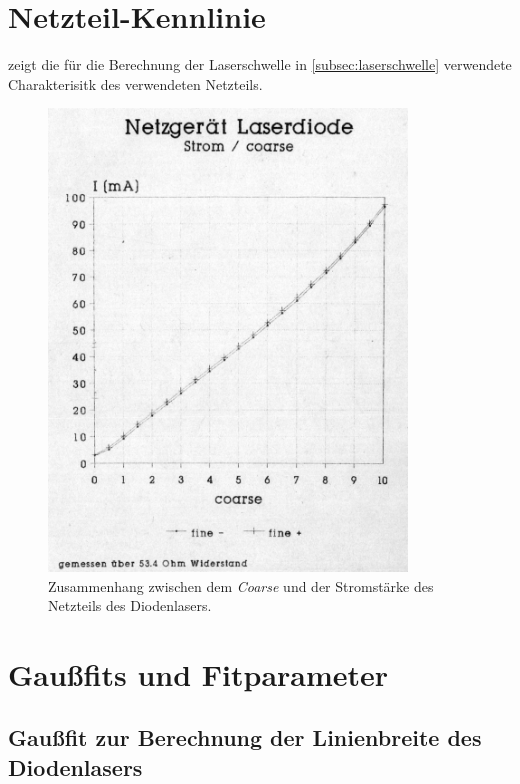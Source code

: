 \documentclass[../bericht.tex]{subfiles}
\begin{document}
  \begin{appendices}

    \section{Netzteil-Kennlinie}
    \label{sec:netzteil-kennlinie}
       zeigt die für die Berechnung der Laserschwelle in \cref{subsec:laserschwelle} verwendete Charakterisitk des verwendeten Netzteils.

      \begin{figure}[H]
        \centering
        \includegraphics[width=0.85\textwidth]{figures/Stromkennlinie_Laserdiode.pdf}
        \caption{Zusammenhang zwischen dem \textit{Coarse} und der Stromstärke des Netzteils des Diodenlasers.}
        \label{fig:netzteil-kennlinie}
      \end{figure}


    \section{Gau\ss{}fits und Fitparameter}
    \label{sec:gauss-fit-parameter}

      \subsection{Gau\ss{}fit zur Berechnung der Linienbreite des Diodenlasers}
      \label{subsec:fit-linienbreite}


\end{appendices}
\end{document}
